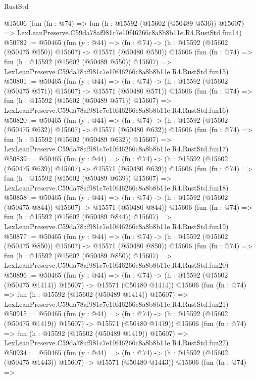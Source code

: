 \begin{lexlean}{RustStd}
\begin{coremodule}
    @15606
    (fun (fn : @74) =>
    fun (h : @15592 (@15602 (@50489 @536)) @15607) =>
    LexLeanPreserve.C59da78af981c7e10f46266c8a8b8b11e.R4.RustStd.fun14)
@50782 := @50465
    (fun (y : @44) =>
    (fn : @74) -> (h : @15592 (@15602 (@50475 @550)) @15607) -> @15571 (@50480 @550))
    @15606
    (fun (fn : @74) =>
    fun (h : @15592 (@15602 (@50489 @550)) @15607) =>
    LexLeanPreserve.C59da78af981c7e10f46266c8a8b8b11e.R4.RustStd.fun15)
@50801 := @50465
    (fun (y : @44) =>
    (fn : @74) -> (h : @15592 (@15602 (@50475 @571)) @15607) -> @15571 (@50480 @571))
    @15606
    (fun (fn : @74) =>
    fun (h : @15592 (@15602 (@50489 @571)) @15607) =>
    LexLeanPreserve.C59da78af981c7e10f46266c8a8b8b11e.R4.RustStd.fun16)
@50820 := @50465
    (fun (y : @44) =>
    (fn : @74) -> (h : @15592 (@15602 (@50475 @632)) @15607) -> @15571 (@50480 @632))
    @15606
    (fun (fn : @74) =>
    fun (h : @15592 (@15602 (@50489 @632)) @15607) =>
    LexLeanPreserve.C59da78af981c7e10f46266c8a8b8b11e.R4.RustStd.fun17)
@50839 := @50465
    (fun (y : @44) =>
    (fn : @74) -> (h : @15592 (@15602 (@50475 @639)) @15607) -> @15571 (@50480 @639))
    @15606
    (fun (fn : @74) =>
    fun (h : @15592 (@15602 (@50489 @639)) @15607) =>
    LexLeanPreserve.C59da78af981c7e10f46266c8a8b8b11e.R4.RustStd.fun18)
@50858 := @50465
    (fun (y : @44) =>
    (fn : @74) -> (h : @15592 (@15602 (@50475 @844)) @15607) -> @15571 (@50480 @844))
    @15606
    (fun (fn : @74) =>
    fun (h : @15592 (@15602 (@50489 @844)) @15607) =>
    LexLeanPreserve.C59da78af981c7e10f46266c8a8b8b11e.R4.RustStd.fun19)
@50877 := @50465
    (fun (y : @44) =>
    (fn : @74) -> (h : @15592 (@15602 (@50475 @850)) @15607) -> @15571 (@50480 @850))
    @15606
    (fun (fn : @74) =>
    fun (h : @15592 (@15602 (@50489 @850)) @15607) =>
    LexLeanPreserve.C59da78af981c7e10f46266c8a8b8b11e.R4.RustStd.fun20)
@50896 := @50465
    (fun (y : @44) =>
    (fn : @74) -> (h : @15592 (@15602 (@50475 @1414)) @15607) -> @15571 (@50480 @1414))
    @15606
    (fun (fn : @74) =>
    fun (h : @15592 (@15602 (@50489 @1414)) @15607) =>
    LexLeanPreserve.C59da78af981c7e10f46266c8a8b8b11e.R4.RustStd.fun21)
@50915 := @50465
    (fun (y : @44) =>
    (fn : @74) -> (h : @15592 (@15602 (@50475 @1419)) @15607) -> @15571 (@50480 @1419))
    @15606
    (fun (fn : @74) =>
    fun (h : @15592 (@15602 (@50489 @1419)) @15607) =>
    LexLeanPreserve.C59da78af981c7e10f46266c8a8b8b11e.R4.RustStd.fun22)
@50934 := @50465
    (fun (y : @44) =>
    (fn : @74) -> (h : @15592 (@15602 (@50475 @1443)) @15607) -> @15571 (@50480 @1443))
    @15606
    (fun (fn : @74) =>

\end{coremodule}
\end{lexlean}
